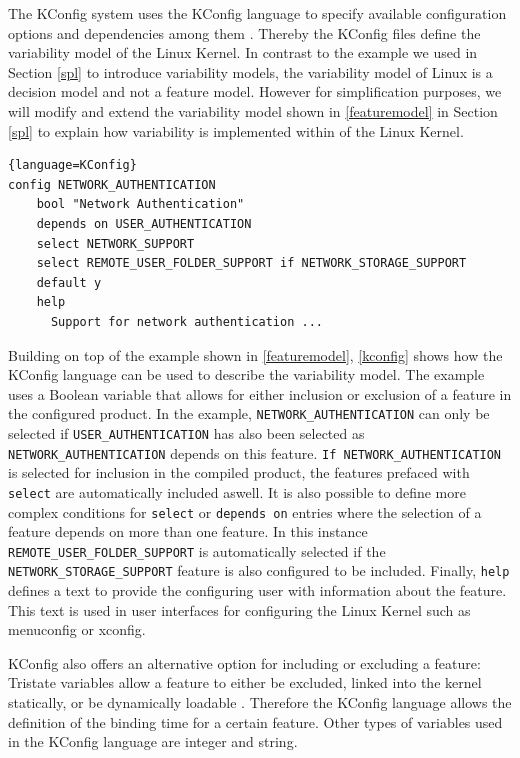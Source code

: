 \documentclass[a4paper]{article}
\begin{document}
The KConfig system uses the KConfig language to specify available configuration options and dependencies among them \cite{variabilitymodel-linux}. Thereby the KConfig files define the variability model of the Linux Kernel. In contrast to the example we used in Section \ref{spl} to introduce variability models, the variability model of Linux is a decision model and not a feature model. However for simplification purposes, we will modify and extend the variability model shown in \autoref{featuremodel} in Section \ref{spl} to explain how variability is implemented within of the Linux Kernel. 

\begin{lstlisting}[caption= KConfig Language, label=kconfig]{language=KConfig}
config NETWORK_AUTHENTICATION
	bool "Network Authentication"
	depends on USER_AUTHENTICATION
	select NETWORK_SUPPORT
	select REMOTE_USER_FOLDER_SUPPORT if NETWORK_STORAGE_SUPPORT
	default y
	help
	  Support for network authentication ...
\end{lstlisting}
 
Building on top of the example shown in \autoref{featuremodel}, \autoref{kconfig} shows how the KConfig language can be used to describe the variability model. The example uses a Boolean variable that allows for either inclusion or exclusion of a feature in the configured product.
In the example, \texttt{NETWORK\_\-AUTHENTICATION} can only be selected if \texttt{USER\_\-AUTHENTICATION} has also been selected as \texttt{NETWORK\_\-AUTHENTICATION} depends on this feature. \texttt{If NETWORK\_\-AUTHENTICATION} is selected for inclusion in the compiled product, the features prefaced with \texttt{select} are automatically included aswell. It is also possible to define more complex conditions for \texttt{select} or \texttt{depends on} entries where the selection of a feature depends on more than one feature. In this instance \texttt{REMOTE\-\_USER\_\-FOLDER\_\-SUPPORT} is automatically selected if the \texttt{NETWORK\_\-STORAGE\-\_SUPPORT} feature is also configured to be included. Finally, \texttt{help} defines a text to provide the configuring user with information about the feature. This text is used in user interfaces for configuring the Linux Kernel such as menuconfig or xconfig.

 KConfig also offers an alternative option for including or excluding a feature: Tristate variables allow a feature to either be excluded, linked into the kernel statically, or be dynamically loadable \cite{variabilitymodel-linux}. Therefore the KConfig language allows the definition of the binding time for a certain feature. Other types of variables used in the KConfig language are integer and string.
\end{document}
